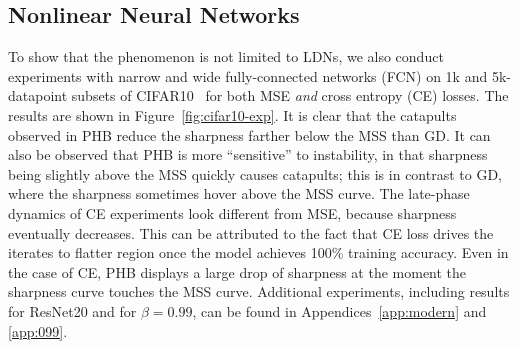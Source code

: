 \subsection{Nonlinear Neural Networks}
\label{sec:modern-arch}
To show that the phenomenon is not limited to LDNs, we also conduct experiments with narrow and wide fully-connected networks (FCN) on 1k and 5k-datapoint subsets of CIFAR10~\citep{krizhevsky2009learning} for both MSE {\it and} cross entropy (CE) losses.
The results are shown in Figure~\ref{fig:cifar10-exp}. It is clear that the catapults observed in PHB reduce the sharpness farther below the MSS than GD. It can also be observed that PHB is more ``sensitive'' to instability, in that sharpness being slightly above the MSS quickly causes catapults; this is in contrast to GD, where the sharpness sometimes hover above the MSS curve. %
The late-phase dynamics of CE experiments look different from MSE, because sharpness eventually decreases. This can be attributed to the fact that CE loss drives the iterates to flatter region once the model achieves 100\% training accuracy. Even in the case of CE, PHB displays a large drop of sharpness at the moment the sharpness curve touches the MSS curve.
Additional experiments, including results for ResNet20 and for $\beta = 0.99$, can be found in Appendices~\ref{app:modern} and \ref{app:099}.

















